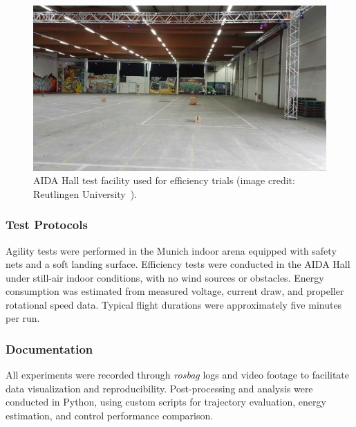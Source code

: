\begin{figure}[h]
\centering
\includegraphics[width=0.85\linewidth]{figures/aida_hall.jpg}
\caption{AIDA Hall test facility used for efficiency trials (image credit: Reutlingen University~\cite{Reu24}).}
\label{fig:aida_hall}
\end{figure}

\subsubsection{Test Protocols}
Agility tests were performed in the Munich indoor arena equipped with safety nets and a soft landing surface.  
Efficiency tests were conducted in the AIDA Hall under still-air indoor conditions, with no wind sources or obstacles.  
Energy consumption was estimated from measured voltage, current draw, and propeller rotational speed data.  
Typical flight durations were approximately five minutes per run.

\subsubsection{Documentation}
All experiments were recorded through \textit{rosbag} logs and video footage to facilitate data visualization and reproducibility.  
Post-processing and analysis were conducted in Python, using custom scripts for trajectory evaluation, energy estimation, and control performance comparison.
